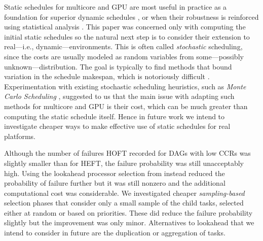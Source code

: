 \documentclass[runningheads]{llncs}
\begin{document}
Static schedules for multicore and GPU are most useful in practice as a foundation for superior dynamic schedules \cite{agullo2016}, or when their robustness is reinforced using statistical analysis \cite{ZHENG20131673}. This paper was concerned only with computing the initial static schedules so the natural next step is to consider their extension to real---i.e., dynamic---environments. This is often called {\em stochastic} scheduling, since the costs are usually modeled as random variables from some---possibly unknown---distribution. The goal is typically to find methods that bound variation in the schedule makespan, which is notoriously difficult \cite{hagstrom88}. Experimentation with existing stochastic scheduling heuristics, such as {\em Monte Carlo Scheduling} \cite{ZHENG20131673}, suggested to us that the main issue with adapting such methods for multicore and GPU is their cost, which can be much greater than computing the static schedule itself. Hence in future work we intend to investigate cheaper ways to make effective use of static schedules for real platforms.  

Although the number of failures HOFT recorded for DAGs with low CCRs was slightly smaller than for HEFT, the failure probability was still unacceptably high. Using the lookahead processor selection from \cite{bittencourt10} instead reduced the probability of failure further but it was still nonzero and the additional computational cost was considerable. We investigated cheaper {\em sampling-based} selection phases that consider only a small sample of the child tasks, selected either at random or based on priorities. These did reduce the failure probability slightly but the improvement was only minor. Alternatives to lookahead that we intend to consider in future are the duplication \cite{duplication} or aggregation of tasks.

\end{document}
